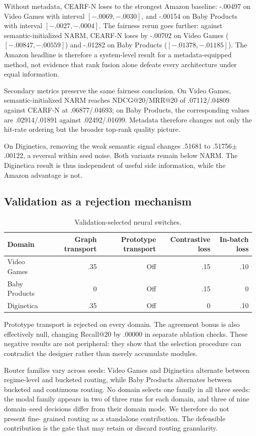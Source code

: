 \documentclass[runningheads]{llncs}
\newcommand{\method}{CEARF-N}
\begin{document}
Without metadata, \method{} loses to the strongest Amazon baseline: -.00497
on Video Games with interval $[-.0069,-.0030]$, and -.00154 on Baby Products
with interval $[-.0027,-.0004]$. The fairness rerun goes further: against
semantic-initialized NARM, \method{} loses by -.00702 on Video Games
($[-.00847,-.00559]$) and -.01282 on Baby Products
($[-.01378,-.01185]$). The Amazon headline is therefore a system-level result
for a metadata-equipped method, not evidence that rank fusion alone defeats
every architecture under equal information.

Secondary metrics preserve the same fairness conclusion. On Video Games,
semantic-initialized NARM reaches NDCG@20/MRR@20 of .07112/.04809 against
\method{} at .06877/.04693; on Baby Products, the corresponding values are
.02914/.01891 against .02492/.01699. Metadata therefore changes not only the
hit-rate ordering but the broader top-rank quality picture.

On Diginetica, removing the weak semantic signal changes .51681 to
.51756$\pm$.00122, a reversal within seed noise. Both variants remain below
NARM. The Diginetica result is thus independent of useful side information,
while the Amazon advantage is not.

\subsection{Validation as a rejection mechanism}
\begin{table}[t]
\caption{Validation-selected neural switches.}
\label{tab:switches}\centering\small
\begin{tabular}{lrrrr}
\toprule Domain & Graph transport & Prototype transport & Contrastive loss & In-batch loss \\
\midrule
Video Games & .35 & Off & .15 & .10 \\
Baby Products & 0 & Off & .15 & 0 \\
Diginetica & .35 & Off & 0 & .10 \\
\bottomrule
\end{tabular}
\end{table}

Prototype transport is rejected on every domain. The agreement bonus is also
effectively null, changing Recall@20 by .00000 in separate ablation checks.
These negative results are not peripheral: they show that the selection
procedure can contradict the designer rather than merely accumulate modules.

Router families vary across seeds: Video Games and Diginetica alternate
between regime-level and bucketed routing, while Baby Products alternates
between bucketed and continuous routing. No domain selects one family in all
three seeds: the modal family appears in two of three runs for each domain,
and three of nine domain--seed decisions differ from their domain mode. We
therefore do not present fine-
grained routing as a standalone contribution. The defensible contribution is
the gate that may retain or discard routing granularity.
\end{document}
